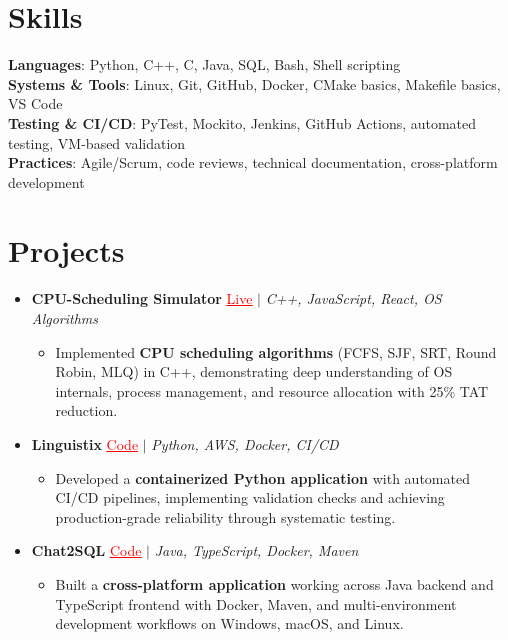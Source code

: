 \documentclass[letterpaper,10pt]{article}
\newcommand{\resumeItem}[1]{\item\small{{#1 \vspace{-2pt}}}}
\newcommand{\resumeProjectHeading}[1]{\item \small #1 \vspace{-2pt}}
\newcommand{\resumeSubHeadingListStart}{\begin{itemize}[leftmargin=0.0in, label={}]}
\newcommand{\resumeSubHeadingListEnd}{\end{itemize}}
\newcommand{\resumeProjItemListStart}{\begin{itemize}[leftmargin=0.15in,label=\textbullet,itemsep=0pt,topsep=0pt,parsep=0pt,partopsep=0pt]}
\newcommand{\resumeProjItemListEnd}{\end{itemize}\vspace{-4pt}}
\begin{document}
\section{Skills}
\begin{itemize}[leftmargin=0.15in, label={}]
\small{\item{
\textbf{Languages}: Python, C++, C, Java, SQL, Bash, Shell scripting \\
\textbf{Systems \& Tools}: Linux, Git, GitHub, Docker, CMake basics, Makefile basics, VS Code \\
\textbf{Testing \& CI/CD}: PyTest, Mockito, Jenkins, GitHub Actions, automated testing, VM-based validation \\
\textbf{Practices}: Agile/Scrum, code reviews, technical documentation, cross-platform development
}}
\end{itemize}
\vspace{-16pt}
\section{Projects}
\resumeSubHeadingListStart
\vspace{-2pt}
\resumeProjectHeading{\textbf{CPU-Scheduling Simulator} {\href{https://cpu-scheduler-amber.vercel.app/}{\textcolor{red}{\underline{Live}}}} $|$ \emph{C++, JavaScript, React, OS Algorithms}}
\resumeProjItemListStart
\resumeItem{Implemented \textbf{CPU scheduling algorithms} (FCFS, SJF, SRT, Round Robin, MLQ) in C++, demonstrating deep understanding of OS internals, process management, and resource allocation with 25\% TAT reduction.}
\resumeProjItemListEnd
\vspace{3pt}
\resumeProjectHeading{\textbf{Linguistix} {\href{https://github.com/SAHAJ-BHADJA/Linguistix}{\textcolor{red}{\underline{Code}}}} $|$ \emph{Python, AWS, Docker, CI/CD}}
\resumeProjItemListStart
\resumeItem{Developed a \textbf{containerized Python application} with automated CI/CD pipelines, implementing validation checks and achieving production-grade reliability through systematic testing.}
\resumeProjItemListEnd
\vspace{3pt}
\resumeProjectHeading{\textbf{Chat2SQL} {\href{https://github.com/SAHAJ-BHADJA/Chat2SQL}{\textcolor{red}{\underline{Code}}}} $|$ \emph{Java, TypeScript, Docker, Maven}}
\resumeProjItemListStart
\resumeItem{Built a \textbf{cross-platform application} working across Java backend and TypeScript frontend with Docker, Maven, and multi-environment development workflows on Windows, macOS, and Linux.}
\resumeProjItemListEnd
\resumeSubHeadingListEnd
\end{document}
